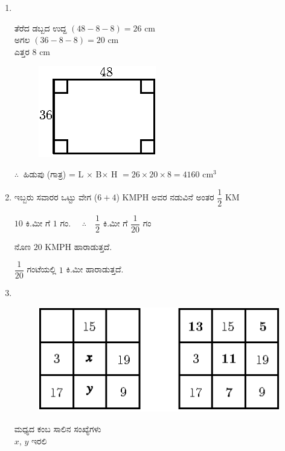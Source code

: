 \begin{enumerate}
\item
~

\begin{minipage}[c]{6cm}
ತೆರೆದ ಡಬ್ಬದ ಉದ್ದ $(48 - 8 - 8) = 26$ cm\\
ಅಗಲ $(36 - 8 - 8) = 20$ cm\\
ಎತ್ತರ $8$ cm
\end{minipage}
\begin{minipage}[c]{3cm}
\begin{figure}[H]
\centering
\includegraphics{images/chap10/ans24.eps}
\end{figure} 
\end{minipage}

\vskip 0.3cm

$\therefore~$ ಹಿಡುಪು (ಗಾತ್ರ) = L $\times$  B$\times$ H $= 26\times 20\times 8 = 4160$ cm$^{3}$

\item  ಇಬ್ಬರು ಸವಾರರ ಒಟ್ಟು ವೇಗ ($6 + 4$) KMPH ಅವರ ನಡುವಿನೆ ಅಂತರ $\dfrac{1}{2}$ KM

$10$ ಕಿ.ಮೀ ಗೆ  $1$ ಗಂ. $\quad\therefore\quad \dfrac{1}{2}$ ಕಿ.ಮೀ ಗೆ $\dfrac{1}{20}$ ಗಂ 

\vskip 0.2cm

ನೊಣ $20$ KMPH ಹಾರಾಡುತ್ತದೆ. 

$\dfrac{1}{20}$ ಗಂಟೆಯಲ್ಲಿ $1$ ಕಿ.ಮೀ ಹಾರಾಡುತ್ತದೆ. 

\vskip 0.5cm

\item 
~

\begin{minipage}[c]{4cm}
\begin{figure}[H]
\centering
\includegraphics[scale=1.3]{images/chap10/ans26.eps}
\end{figure} 
\end{minipage}
\begin{minipage}[c]{5cm}
ಮಧ್ಯದ ಕಂಬ ಸಾಲಿನ ಸಂಖ್ಯೆಗಳು \\ 
$x$, $y$ ಇರಲಿ 
\end{minipage}


\end{enumerate}
